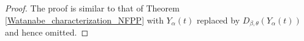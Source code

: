 \documentclass[11pt,oneside,reqno]{amsart}
\theoremstyle{definition}
\theoremstyle{remarkstyle}
\begin{document}
\begin{proof}   
The proof is similar to that of Theorem \ref{Watanabe_characterization_NFPP} with $Y_{\alpha}(t)$ replaced by $D_{\beta,\theta}(Y_{\alpha}(t))$ and hence omitted.

   

\end{proof}
\end{document}
